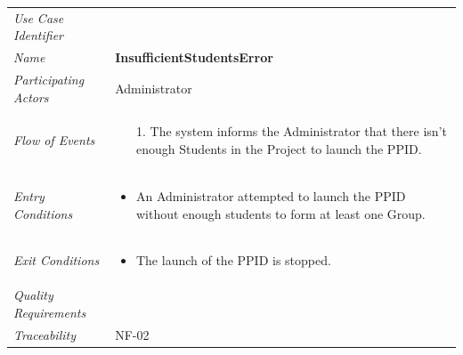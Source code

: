\documentclass[12pt,letterpaper]{article}
\begin{document}
\begin{center}
	\begin{tabu} to 
		\toprule
		Use Case Identifier & \insufficientstudentserror{} \\
		Name & {\bf InsufficientStudentsError} \\
		Participating Actors & Administrator \\
		Flow of Events & 
		\begin{minipage}[t]{\linewidth}
		    \begin{enumerate}
			    \item[1.] The system informs the Administrator that there isn't enough Students in the Project to launch the PPID.
			\end{enumerate}
	    \end{minipage} \\

		Entry Conditions &
		\begin{minipage}[t]{\linewidth}
			\begin{itemize}
			    \item An Administrator attempted to launch the PPID without enough students to form at least one Group.
	        \end{itemize}
	    \end{minipage} \\

		Exit Conditions &
		\begin{minipage}[t]{\linewidth}
			\begin{itemize}
			    \item The launch of the PPID is stopped.
	        \end{itemize}
	    \end{minipage} \\

		Quality Requirements & \\

		Traceability & NF-02 \\
		\toprule
	\end{tabu}
\end{center}
\end{document}
